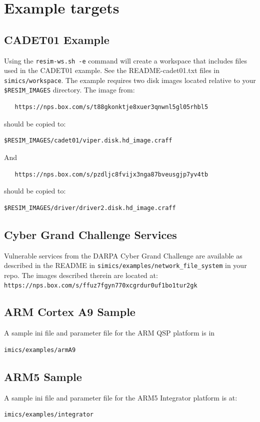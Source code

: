 \documentclass[titlepage]{article}
\begin{document}
\section{Example targets}
\label{example-targets}
\subsection{CADET01 Example}
Using the {\tt resim-ws.sh -e} command will create a workspace that includes files used in the CADET01 example.
See the README-cadet01.txt files in {\tt simics/workspace}.
The example requires two disk images located relative to your {\tt \$RESIM\_IMAGES} directory.  The image from: 
\begin{verbatim}
   https://nps.box.com/s/t88gkonktje8xuer3qnwnl5gl05rhbl5
\end{verbatim}
\noindent should be copied to:
\begin{verbatim}
$RESIM_IMAGES/cadet01/viper.disk.hd_image.craff
\end{verbatim}
And
\begin{verbatim}
   https://nps.box.com/s/pzdljc8fvijx3nga87bveusgjp7yv4tb
\end{verbatim}
\noindent should be copied to:
\begin{verbatim}
$RESIM_IMAGES/driver/driver2.disk.hd_image.craff
\end{verbatim}

\subsection{Cyber Grand Challenge Services}
Vulnerable services from the DARPA Cyber Grand Challenge are available as described in the
README in {\tt simics/examples/network\_file\_system} in your repo.
The images described therein are located at: 
\newline
{\tt https://nps.box.com/s/ffuz7fgyn770xcgrdur0uf1bo1tur2gk}

\subsection{ARM Cortex A9 Sample}
A sample ini file and parameter file for the ARM QSP platform is in 
\begin{verbatim}
imics/examples/armA9
\end{verbatim}

\subsection{ARM5 Sample}
A sample ini file and parameter file for the ARM5 Integrator platform is at:
\begin{verbatim}
imics/examples/integrator
\end{verbatim}
\end{document}
